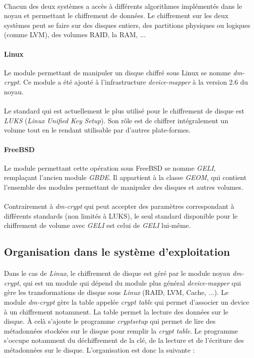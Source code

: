 \paragraph{}
Chacun des deux systèmes a accès à différents algorithmes implémentés dans le
noyau et permettant le chiffrement de données. Le chiffrement sur
les deux systèmes peut se faire sur des disques entiers, des partitions
physiques ou logiques (comme LVM), des volumes RAID, la RAM, ...
\paragraph{Linux}
Le module permettant de manipuler un disque chiffré sous Linux se nomme
\textit{dm-crypt}. Ce module a été ajouté à l'infrastructure
\textit{device-mapper} à la version 2.6 du noyau.\\
\\
Le standard qui est actuellement le plus utilisé pour le chiffrement de disque
est \textit{LUKS} (\textit{Linux Unified Key Setup}\cite{onDiskFormatLuks}). Son
rôle est de chiffrer intégralement un volume tout en le rendant utilisable par
d'autres plate-formes.
\paragraph{FreeBSD}
Le module permettant cette opération sous FreeBSD se nomme \textit{GELI},
remplaçant l'ancien module \textit{GBDE}. Il appartient à la classe
\textit{GEOM}, qui contient l'ensemble des modules permettant de manipuler des
disques et autres volumes.\\
\\
Contrairement à \textit{dm-crypt} qui peut accepter des paramètres correspondant
à différents standards (non limités à LUKS), le seul standard disponible pour
le chiffrement de volume avec \textit{GELI} est celui de \textit{GELI} lui-même.

\subsection{Organisation dans le système d'exploitation}
\paragraph{}
Dans le cas de {\em Linux}, le chiffrement de disque est géré par le module 
noyau {\em dm-crypt}, qui est un module qui dépend du module plus général
{\em device-mapper} qui gère les transformations de disque sous {\em Linux} 
(RAID, LVM, Cache, ...).
Le module {\em dm-crypt} gère la table appelée {\em crypt table}
qui permet d'associer un device à un chiffrement notamment. La table permet
la lecture des données sur le disque. À celà s'ajoute le programme 
{\em cryptsetup} qui permet de lire des métadonnées stockées sur le disque 
pour remplir la {\em crypt table}.
Le programme s'occupe notamment du déchiffrement de la clé, de 
la lecture et de l'écriture des métadonnées sur le disque. L'organisation est 
donc la suivante :

